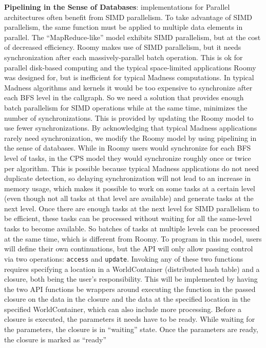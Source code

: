 \documentclass{article}
\begin{document}
\begin{enumerate}
{\bf Pipelining in the Sense of Databases}: implementations for Parallel architectures
often benefit from SIMD parallelism. To take advantage of SIMD parallelism, the same
function must be applied to multiple data elements in parallel. The ``MapReduce-like''
model exhibits SIMD parallelism, but at the cost of decreased efficiency. Roomy
makes use of SIMD parallelism, but it needs synchronization after each massively-parallel
batch operation. This is ok for parallel disk-based computing and the typical
space-limited applications Roomy was designed for, but is inefficient for typical
Madness computations. In typical Madness algorithms and kernels it would be too expensive
to synchronize after each BFS level in the callgraph. So we need a solution that
provides enough batch parallelism for SIMD operations while at the same
time, minimizes the number of synchronizations. This is provided by updating the
Roomy model to use fewer synchronizations.
By acknowledging that typical Madness applications rarely need synchronization,
we modify the Roomy model by using pipelining in the sense of databases.
While in Roomy users would synchronize for each BFS level of tasks, in the
CPS model they would synchronize roughly once or twice per algorithm. This
is possible because typical Madness applications do not need duplicate detection,
so delaying synchronization will not lead to an increase in memory usage, which
makes it possible to work on some tasks at a certain level (even though not
all tasks at that level are available) and generate tasks at the next level.
Once there are enough tasks at the next level for SIMD parallelism to be efficient,
these tasks can be processed without waiting for all the same-level tasks
to become available. So batches of tasks at multiple levels can be processed
at the same time, which is different from Roomy.
 To program in this model, users will define their own continuations,
but the API will only allow passing control via two operations: {\tt access} and
{\tt update}. Invoking any of these two functions requires specifying a location in a 
WorldContainer (distributed hash table) and a closure, both being the user's
responsibility. This will be implemented
by having the two API functions be wrappers around executing the function in the
passed closure on the data in the closure and the data at the specified
location in the specified WorldContainer, which can also include
more processing. Before a closure is executed, the parameters it needs have to be ready.
While waiting for the parameters, the closure is in ``waiting'' state.
Once the parameters are ready, the closure is marked as ``ready''

\end{enumerate}
\end{document}
